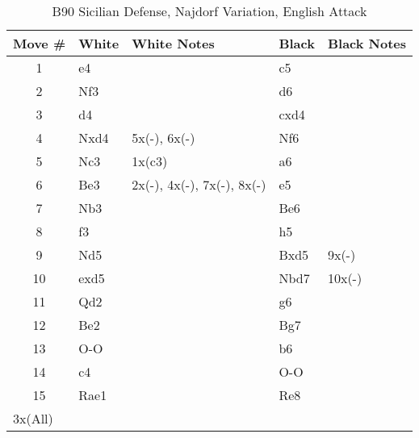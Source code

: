 \begin{table}[htbp]
\centering
\scriptsize
\caption{B90 Sicilian Defense, Najdorf Variation, English Attack}
\begin{tabular}{|c|l|p{5cm}|l|p{5cm}|}
\hline
\textbf{Move \#} & \textbf{White} & \textbf{White Notes} & \textbf{Black} & \textbf{Black Notes} \\
\hline
1  & e4    &                     & c5    &                        \\
2  & Nf3   &                     & d6    &                        \\
3  & d4    &                     & cxd4  &                        \\
4  & Nxd4  & 5x(-), 6x(-)        & Nf6   &                        \\
5  & Nc3   & 1x(c3)              & a6    &                        \\
6  & Be3   & 2x(-), 4x(-), 7x(-), 8x(-) & e5    &                        \\
7  & Nb3   &                     & Be6   &                        \\
8  & f3    &                     & h5    &                        \\
9  & Nd5   &                     & Bxd5  & 9x(-)                  \\
10 & exd5  &                     & Nbd7  & 10x(-)                 \\
11 & Qd2   &                     & g6    &                        \\
12 & Be2   &                     & Bg7   &                        \\
13 & O-O   &                     & b6    &                        \\
14 & c4    &                     & O-O   &                        \\
15 & Rae1  &                     & Re8   &                        \\
\hline
\multicolumn{5}{|l|}{3x(All)} \\
\hline
\end{tabular}
\end{table}

